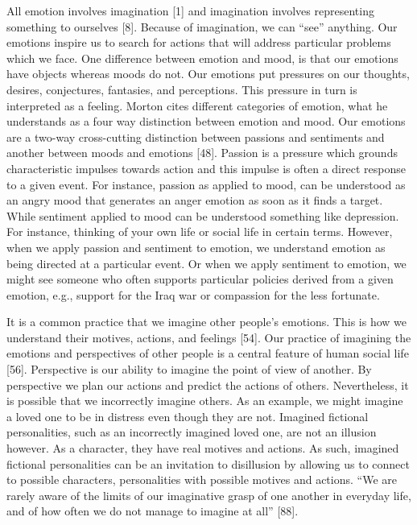 \documentclass[phdthesis,12pt,final]{wuthesis}
\theoremstyle{definition}
\theoremstyle{definition}
\theoremstyle{definition}
\theoremstyle{definition}
\theoremstyle{remark}
\begin{document}
All emotion involves imagination {[}1{]} and imagination involves representing something to ourselves {[}8{]}. Because of imagination, we can ``see'' anything. Our emotions inspire us to search for actions that will address particular problems which we face. One difference between emotion and mood, is that our emotions have objects whereas moods do not. Our emotions put pressures on our thoughts, desires, conjectures, fantasies, and perceptions. This pressure in turn is interpreted as a feeling. Morton cites different categories of emotion, what he understands as a four way distinction between emotion and mood. Our emotions are a two-way cross-cutting distinction between passions and sentiments and another between moods and emotions {[}48{]}. Passion is a pressure which grounds characteristic impulses towards action and this impulse is often a direct response to a given event. For instance, passion as applied to mood, can be understood as an angry mood that generates an anger emotion as soon as it finds a target. While sentiment applied to mood can be understood something like depression. For instance, thinking of your own life or social life in certain terms. However, when we apply passion and sentiment to emotion, we understand emotion as being directed at a particular event. Or when we apply sentiment to emotion, we might see someone who often supports particular policies derived from a given emotion, e.g., support for the Iraq war or compassion for the less fortunate.

It is a common practice that we imagine other people's emotions. This is how we understand their motives, actions, and feelings {[}54{]}. Our practice of imagining the emotions and perspectives of other people is a central feature of human social life {[}56{]}. Perspective is our ability to imagine the point of view of another. By perspective we plan our actions and predict the actions of others. Nevertheless, it is possible that we incorrectly imagine others. As an example, we might imagine a loved one to be in distress even though they are not. Imagined fictional personalities, such as an incorrectly imagined loved one, are not an illusion however. As a character, they have real motives and actions. As such, imagined fictional personalities can be an invitation to disillusion by allowing us to connect to possible characters, personalities with possible motives and actions. ``We are rarely aware of the limits of our imaginative grasp of one another in everyday life, and of how often we do not manage to imagine at all'' {[}88{]}.
\end{document}
